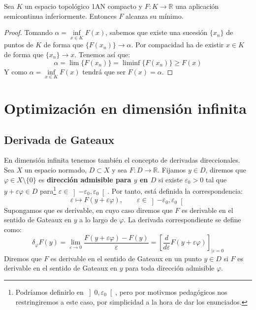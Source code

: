 \begin{teo}
    Sea $K$ un espacio topológico 1AN compacto y $F:K\to \mathbb{R}$ una aplicación semicontinua inferiormente. Entonces $F$ alcanza su mínimo.
    \begin{proof}
        Tomando $\alpha = \inf\limits_{x\in K}F(x)$, sabemos que existe una sucesión $\{x_n\}$ de puntos de $K$ de forma que $\{F(x_n)\}\to \alpha$. Por compacidad ha de existir $x\in K$ de forma que $\{x_n\}\to x$. Tenemos así que:
        \begin{equation*}
            \alpha = \lim \{F(x_n)\} = \liminf \{F(x_n)\} \geq F(x)
        \end{equation*}
        Y como $\alpha = \inf\limits_{x\in K}F(x)$ tendrá que ser $F(x) = \alpha$.
    \end{proof}
\end{teo}

\chapter{Optimización en dimensión infinita}
\section{Derivada de Gateaux}
\noindent
En dimensión infinita tenemos también el concepto de derivadas direccionales.\\

\noindent
Sea $X$ un espacio normado, $D\subset X$ y sea $F:D\to \mathbb{R}$. Fijamos $y\in D$, diremos que $\varphi \in X\setminus \{0\}$ es \textbf{dirección admisible para $y$ en $D$} si existe $\varepsilon_0>0$ tal que $y+\varepsilon\varphi \in D$ para\footnote{Podríamos definirlo en $\left]0,\varepsilon_0\right[$, pero por motivmos pedagógicos nos restringiremos a este caso, por simplicidad a la hora de dar los enunciados.} $\varepsilon \in \left]-\varepsilon_0,\varepsilon_0\right[$. Por tanto, está definida la correspondencia:
\begin{equation*}
    \varepsilon\longmapsto F(y+\varepsilon\varphi), \qquad \varepsilon \in \left]-\varepsilon_0,\varepsilon_0\right[
\end{equation*}
Supongamos que es derivable, en cuyo caso diremos que $F$ es derivable en el sentido de Gateaux en $y$ a lo largo de $\varphi$. La derivada correspondiente se define como:
\begin{equation*}
    \delta_\varphi F(y) = \lim_{\varepsilon\to0} \frac{F(y+\varepsilon\varphi)-F(y)}{\varepsilon} = \left[\frac{d}{d\varepsilon}F(y+\varepsilon\varphi)\right]_{\big|\varepsilon=0}
\end{equation*}
Diremos que $F$ es derivable en el sentido de Gateaux en un punto $y\in D$ si $F$ es derivable en el sentido de Gateaux en $y$ para toda dirección admisible $\varphi$.

